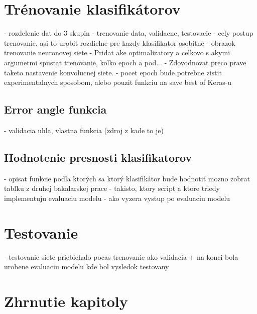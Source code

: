 \section{Trénovanie klasifikátorov}
- rozdelenie dat do 3 skupin - trenovanie data, validacne, testovacie
- cely postup trenovanie, asi to urobit rozdielne pre kazdy klasifikator osobitne
- obrazok trenovanie neuronovej siete
- Pridat ake optimalizatory a celkovo s akymi argumetmi spustat trenovanie, kolko epoch a pod...
- Zdovodnovat preco prave taketo nastavenie konvolucnej siete.
- pocet epoch bude potrebne zistit experimentalnych sposobom, alebo pouzit funkciu na save best of Keras-u

\subsection{Error angle funkcia}
- validacia uhla, vlastna funkcia (zdroj z kade to je)

\subsection{Hodnotenie presnosti klasifikatorov}
- opisat funkcie podľa ktorých sa ktorý klasifikátor bude hodnotiť
  mozno zobrat tabľku z druhej bakalarskej prace
- takisto, ktory script a ktore triedy implementuju evaluaciu modelu
- ako vyzera vystup po evaluaciu modelu

\section{Testovanie}
- testovanie siete priebiehalo pocas trenovanie ako validacia
  + na konci bola urobene evaluaciu modelu kde bol vysledok testovany

\section{Zhrnutie kapitoly}


